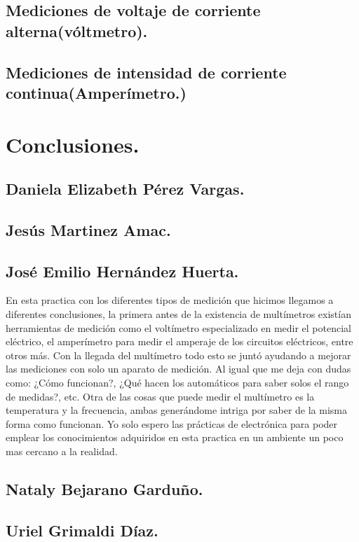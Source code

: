 \documentclass[10pt]{article}
\begin{document}
\begin{multicols}{2}
\subsection{Mediciones de voltaje de corriente alterna(vóltmetro).}

\subsection{Mediciones de intensidad de corriente continua(Amperímetro.)}




\section{Conclusiones.}

\subsection*{Daniela Elizabeth Pérez Vargas.}

\subsection*{Jesús Martinez Amac.}
\subsection*{José Emilio Hernández Huerta.}
En esta practica con los diferentes tipos de medición que hicimos llegamos a diferentes conclusiones, la primera antes de la existencia de multímetros existían herramientas de medición como el voltímetro especializado en medir el potencial eléctrico, el amperímetro para medir el amperaje de los circuitos eléctricos, entre otros más. Con la llegada del multímetro todo esto se juntó ayudando a mejorar las mediciones con solo un aparato de medición. Al igual que me deja con dudas como: ¿Cómo funcionan?, ¿Qué hacen los automáticos para saber solos el rango de medidas?, etc. Otra de las cosas que puede medir el multímetro es la temperatura y la frecuencia, ambas generándome intriga por saber de la misma forma como funcionan. Yo solo espero las prácticas de electrónica para poder emplear los conocimientos adquiridos en esta practica en un ambiente un poco mas cercano a la realidad. 
\subsection*{Nataly Bejarano Garduño.}
\subsection*{Uriel Grimaldi Díaz.}

\end{multicols}
\newpage
\clearpage
\begin{thebibliography}{0}
\end{thebibliography}
\end{document}
